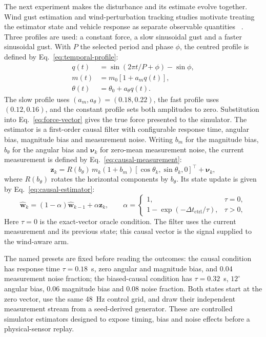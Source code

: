 The next experiment makes the disturbance and its estimate evolve together. Wind
gust estimation and wind-perturbation tracking studies motivate treating the
estimator state and vehicle response as separate observable quantities
~\cite{azid2021windgust,perozzi2018wind}. Three profiles are used: a constant
force, a slow sinusoidal gust and a faster sinusoidal gust. With $P$ the selected
period and phase $\phi$, the centred profile is defined by
Eq.~\eqref{eq:temporal-profile}:
\begin{equation}
  \begin{aligned}
  q(t)&=\sin(2\pi t/P+\phi)-\sin\phi,\\
  m(t)&=m_0[1+a_mq(t)],\\
  \theta(t)&=\theta_0+a_\theta q(t).
  \end{aligned}
  \label{eq:temporal-profile}
\end{equation}
The slow profile uses
$(a_m,a_\theta)=(0.18,0.22)$, the fast profile uses $(0.12,0.16)$, and the
constant profile sets both amplitudes to zero. Substitution into
Eq.~\eqref{eq:force-vector} gives the true force
presented to the simulator. The estimator is a first-order causal filter with
configurable response time, angular bias, magnitude bias and measurement noise.
Writing $b_m$ for the magnitude bias, $b_\theta$ for the angular bias and
$\boldsymbol\nu_k$ for zero-mean measurement noise, the current measurement is
defined by Eq.~\eqref{eq:causal-measurement}:
\begin{equation}
  \mathbf{z}_k=R(b_\theta)\,m_k(1+b_m)[\cos\theta_k,\sin\theta_k,0]^{\top}
  +\boldsymbol\nu_k,
  \label{eq:causal-measurement}
\end{equation}
where $R(b_\theta)$ rotates the horizontal components by $b_\theta$. Its state
update is given by Eq.~\eqref{eq:causal-estimator}:
\begin{equation}
  \widehat{\mathbf w}_k=(1-\alpha)\widehat{\mathbf w}_{k-1}+\alpha\mathbf{z}_k,
  \qquad
  \alpha=\begin{cases}1,&\tau=0,\\
  1-\exp(-\Delta t_{\mathrm{ctrl}}/\tau),&\tau>0,
  \end{cases}
  \label{eq:causal-estimator}
\end{equation}
Here $\tau=0$ is the exact-vector oracle condition. The filter uses the current
measurement and its previous state; this causal vector is the signal supplied to
the wind-aware arm.


The named presets are fixed before reading the outcomes: the causal condition has
response time $\tau=0.18$~s, zero angular and magnitude bias, and 0.04 measurement
noise fraction; the biased-causal condition has $\tau=0.32$~s, $12^\circ$ angular
bias, 0.06 magnitude bias and 0.08 noise fraction. Both states start at the zero
vector, use the same 48~Hz control grid, and draw their independent measurement
stream from a seed-derived generator. These are controlled simulator estimators
designed to expose timing, bias and noise effects before a physical-sensor replay.


